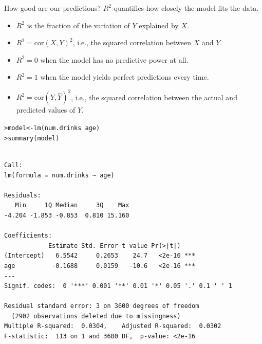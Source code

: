\documentclass{beamer}\usepackage[]{graphicx}\usepackage[]{color}
\makeatletter
\newcommand{\hlopt}[1]{\textcolor[rgb]{1,0.894,0.769}{#1}}%
\newcommand{\hlstd}[1]{\textcolor[rgb]{1,0.894,0.769}{#1}}%
\newcommand{\hlkwb}[1]{\textcolor[rgb]{0.804,0.776,0.451}{#1}}%
\newcommand{\hlkwd}[1]{\textcolor[rgb]{1,0.78,0.769}{#1}}%
\newenvironment{kframe}{%
 \def\at@end@of@kframe{}%
 \ifinner\ifhmode%
  \def\at@end@of@kframe{\end{minipage}}%
  \begin{minipage}{\columnwidth}%
 \fi\fi%
 \def\FrameCommand##1{\hskip\@totalleftmargin \hskip-\fboxsep
 \colorbox{shadecolor}{##1}\hskip-\fboxsep
     \hskip-\linewidth \hskip-\@totalleftmargin \hskip\columnwidth}%
 \MakeFramed {\advance\hsize-\width
   \@totalleftmargin\z@ \linewidth\hsize
   \@setminipage}}%
 {\par\unskip\endMakeFramed%
 \at@end@of@kframe}
\newenvironment{knitrout}{}{} %
\makeatother
\begin{document}
\begin{darkframes}
    \begin{frame}{How good are our predictions?}
      $R^2$ quantifies how closely the model fits the data.
      \begin{itemize}[<+->]
        \item $R^2$ is the fraction of the variation of $Y$ explained by $X$.
        \item $R^2=\text{cor}(X,Y)^2$, i.e., the squared correlation between $X$ and $Y$.
        \item $R^2=0$ when the model has no predictive power at all.
        \item $R^2=1$ when the model yields perfect predictions every time.
        \item $R^2=\text{cor}(Y,\hat Y)^2$, i.e., the squared correlation between the actual and predicted values of $Y$.
      \end{itemize}
    \end{frame}

    \begin{frame}[fragile]
      \fontsize{9}{9}\selectfont
\begin{knitrout}
\begin{kframe}
\begin{alltt}
\hlstd{> }\hlstd{model} \hlkwb{<-} \hlkwd{lm}\hlstd{(num.drinks} \hlopt{~} \hlstd{age)}
\hlstd{> }\hlkwd{summary}\hlstd{(model)}
\end{alltt}
\begin{verbatim}

Call:
lm(formula = num.drinks ~ age)

Residuals:
   Min     1Q Median     3Q    Max 
-4.204 -1.853 -0.853  0.810 15.160 

Coefficients:
            Estimate Std. Error t value Pr(>|t|)    
(Intercept)   6.5542     0.2653    24.7   <2e-16 ***
age          -0.1688     0.0159   -10.6   <2e-16 ***
---
Signif. codes:  0 '***' 0.001 '**' 0.01 '*' 0.05 '.' 0.1 ' ' 1

Residual standard error: 3 on 3600 degrees of freedom
  (2902 observations deleted due to missingness)
Multiple R-squared:  0.0304,	Adjusted R-squared:  0.0302 
F-statistic:  113 on 1 and 3600 DF,  p-value: <2e-16
\end{verbatim}
\end{kframe}
\end{knitrout}
    \end{frame} 


\end{darkframes}
\end{document}
